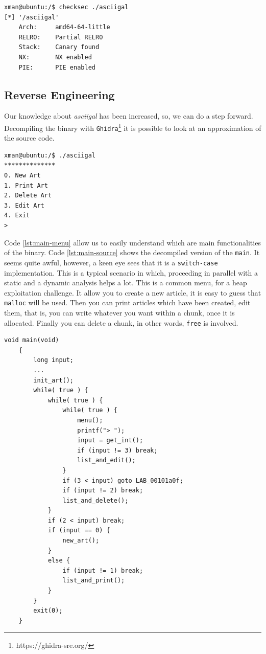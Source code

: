 \documentclass{article}
\numberwithin{equation}{subsection}
\begin{document}
\begin{minipage}{\textwidth}
\centering
\lstset{style=consolestyle}
\begin{lstlisting}[caption={Checksec command on asciigal executable.},captionpos=b,label={lst:checksec-command}]
xman@ubuntu:/$ checksec ./asciigal
[*] '/asciigal'
    Arch:     amd64-64-little
    RELRO:    Partial RELRO
    Stack:    Canary found
    NX:       NX enabled
    PIE:      PIE enabled
\end{lstlisting}
\end{minipage}
\subsection{Reverse Engineering}
\label{functionalities}
Our knowledge about \emph{asciigal} has been increased, so, we can do a step forward. Decompiling the binary with \texttt{Ghidra}\footnote{https://ghidra-sre.org/} it is possible to look at an approximation of the source code.\newline
\begin{minipage}{\textwidth}
\centering
\lstset{style=consolestyle}
\begin{lstlisting}[caption={Main menu of asciigal executable.},captionpos=b,label={lst:main-menu}]
xman@ubuntu:/$ ./asciigal
**************
0. New Art
1. Print Art
2. Delete Art
3. Edit Art
4. Exit
> 
\end{lstlisting}
\end{minipage}
Code \ref{lst:main-menu} allow us to easily understand which are main functionalities of the binary.\newline
Code \ref{lst:main-source} shows the decompiled version of the \texttt{main}. It seems quite awful, however, a keen eye sees that it is a \texttt{switch-case} implementation. This is a typical scenario in which, proceeding in parallel with a static and a dynamic analysis helps a lot.
This is a common menu, for a heap exploitation challenge. It allow you to create a new article, it is easy to guess that \texttt{malloc} will be used. Then you can print articles which have been created, edit them, that is, you can write whatever you want within a chunk, once it is allocated. Finally you can delete a chunk, in other words,  \texttt{free} is involved.\newline
\begin{minipage}{\textwidth}
\centering
\lstset{style=cstyle}
\begin{lstlisting}[caption={Main routine of asciigal source code.},captionpos=b,label={lst:main-source}]
    void main(void)
    {
    	long input;
    	...
    	init_art();
    	while( true ) {
    		while( true ) {
    			while( true ) {
    				menu();
    				printf("> ");
    				input = get_int();
    				if (input != 3) break;
    				list_and_edit();
    			}
    			if (3 < input) goto LAB_00101a0f;
    			if (input != 2) break;
    			list_and_delete();
    		}
    		if (2 < input) break;
    		if (input == 0) {
    			new_art();
    		}
    		else {
    			if (input != 1) break;
    			list_and_print();
    		}
    	}
    	exit(0);
    }
\end{lstlisting}
\end{minipage}
\end{document}
